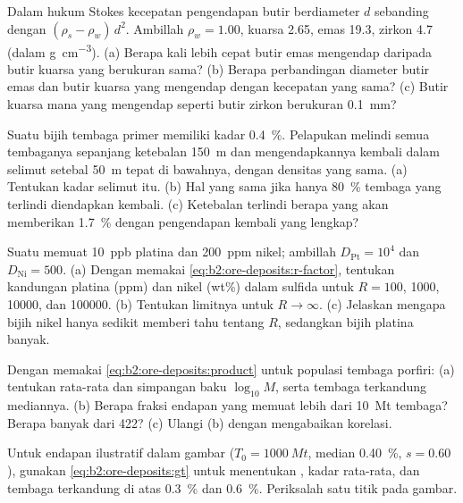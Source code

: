 \begin{exercise}[$\star$]\label{exo:b2:ore-deposits:3}
Dalam hukum Stokes kecepatan pengendapan butir berdiameter $d$ sebanding dengan $(\rho_s -
\rho_w)\,d^2$. Ambillah $\rho_w = 1.00$, kuarsa 2.65, emas 19.3, zirkon 4.7 (dalam
\unit{g.cm^{-3}}). (a) Berapa kali lebih cepat butir emas mengendap daripada butir kuarsa yang
berukuran sama? (b) Berapa perbandingan diameter butir emas dan butir kuarsa yang mengendap dengan
kecepatan yang sama? (c) Butir kuarsa mana yang mengendap seperti butir zirkon berukuran \qty{0.1}{mm}?
\end{exercise}

\begin{exercise}[$\star$]\label{exo:b2:ore-deposits:4}
Suatu bijih tembaga primer memiliki kadar \qty{0.4}{\percent}. Pelapukan melindi semua tembaganya sepanjang
ketebalan \qty{150}{m} dan mengendapkannya kembali dalam selimut setebal \qty{50}{m} tepat di bawahnya, dengan densitas
yang sama. (a) Tentukan kadar selimut itu. (b) Hal yang sama jika hanya \qty{80}{\percent} tembaga
yang terlindi diendapkan kembali. (c) Ketebalan terlindi berapa yang akan memberikan \qty{1.7}{\percent} dengan
pengendapan kembali yang lengkap?
\end{exercise}

\begin{exercise}[$\star\star$]\label{exo:b2:ore-deposits:5}
Suatu  memuat \qty{10}{ppb} platina dan \qty{200}{ppm} nikel; ambillah $D_{\mathrm{Pt}} =
10^4$ dan $D_{\mathrm{Ni}} = 500$. (a) Dengan memakai \eqref{eq:b2:ore-deposits:r-factor}, tentukan
kandungan platina (ppm) dan nikel (wt\%) dalam sulfida untuk $R = 100$, \num{1000}, \num{10000},
dan \num{100000}. (b) Tentukan limitnya untuk $R \to \infty$. (c) Jelaskan mengapa bijih nikel hanya
sedikit memberi tahu tentang $R$, sedangkan bijih platina banyak.
\end{exercise}

\begin{exercise}[$\star\star$]\label{exo:b2:ore-deposits:6}
Dengan memakai \eqref{eq:b2:ore-deposits:product} untuk populasi tembaga porfiri: (a) tentukan rata-rata dan
simpangan baku $\log_{10} M$, serta tembaga terkandung mediannya. (b) Berapa fraksi endapan yang
memuat lebih dari \qty{10}{Mt} tembaga? Berapa banyak dari 422? (c) Ulangi (b) dengan mengabaikan korelasi.
\end{exercise}

\begin{exercise}[$\star\star$]\label{exo:b2:ore-deposits:7}
Untuk endapan ilustratif dalam gambar ($T_0 = \qty{1000}{Mt}$, median \qty{0.40}{\percent},
$s = 0.60$), gunakan \eqref{eq:b2:ore-deposits:gt} untuk menentukan , kadar rata-rata, dan tembaga terkandung
di atas  \qty{0.3}{\percent} dan \qty{0.6}{\percent}. Periksalah satu titik pada gambar.
\end{exercise}

